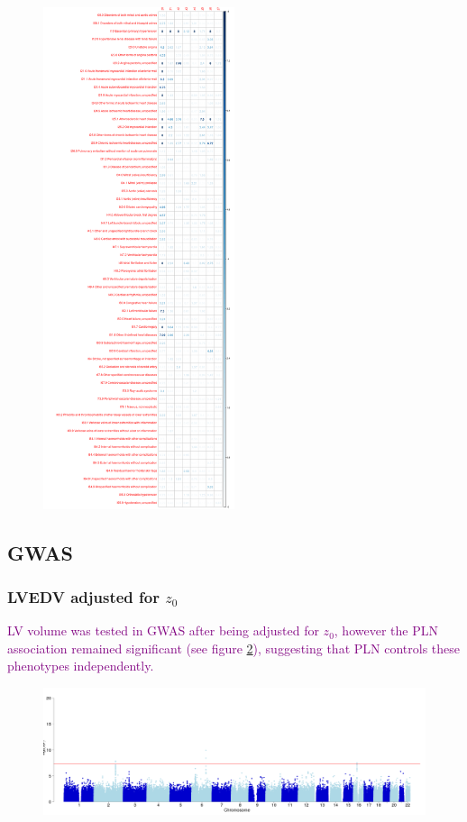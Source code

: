 \documentclass[fleqn,10pt]{wlscirep}
\begin{document}
\begin{figure}
\includegraphics[width=0.5\textwidth]{figs/diseases/experiment_2_health_outcome_t-test}
\label{fig:health_outcomes}
\end{figure}


\subsection{GWAS}

\subsubsection{LVEDV adjusted for $z_0$}
\textcolor{purple}{LV volume was tested in GWAS after being adjusted for $z_0$, however the PLN association remained significant (see figure \ref{fig:LVEDV_adj_by_z5}), suggesting that PLN controls these phenotypes independently.}

\begin{figure}[ht!]
\includegraphics[width=\textwidth]{figs/supplementary/GWAS__LVEDV__std_covariates_adj_by_z5__GBR_ALL__qc__manhattan}
\label{fig:LVEDV_adj_by_z5}
\end{figure}
\end{document}
